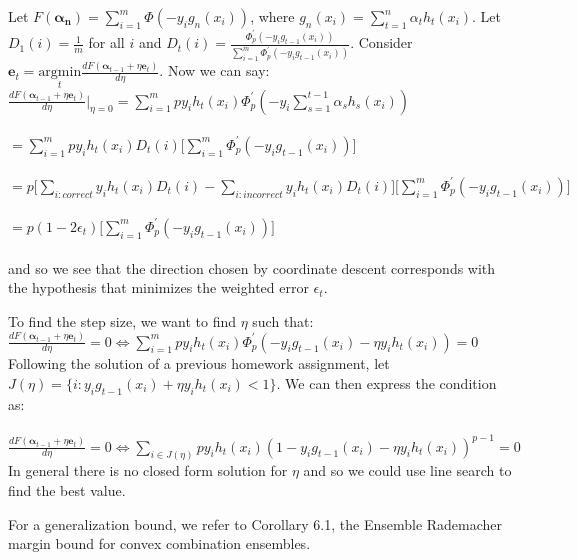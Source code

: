 \documentclass[]{article}
\begin{document}
Let $F(\boldsymbol{\alpha_n}) = \sum_{i=1}^{m} \Phi(-y_i g_n(x_i))$, where $g_n(x_i) = \sum_{t=1}^{n} \alpha_t h_t(x_i)$. Let $D_1(i) = \frac{1}{m}$ for all $i$ and $D_t(i) = \frac{\Phi_p^\prime(-y_i g_{t-1}(x_i))}{\sum_{i=1}^{m}\Phi_p^\prime(-y_i g_{t-1}(x_i))}$. Consider $\boldsymbol{e}_t = \underset{t}{\text{argmin}} \frac{d F(\boldsymbol{\alpha}_{t-1}+\eta \boldsymbol{e}_t)}{d \eta}$. Now we can say:\\

\noindent $\frac{d F(\boldsymbol{\alpha}_{t-1}+\eta \boldsymbol{e}_t)}{d \eta} |_{\eta=0} = \sum_{i=1}^{m} p y_i h_t(x_i)\Phi_p^\prime(-y_i \sum_{s=1}^{t-1}\alpha_s h_s(x_i))$\\\\
$= \sum_{i=1}^{m} p y_i h_t(x_i) D_t(i)\lbrack\sum_{i=1}^{m}\Phi_p^\prime(-y_i g_{t-1}(x_i))\rbrack$\\\\
$= p \lbrack \sum_{i:correct} y_i h_t(x_i) D_t(i) - \sum_{i:incorrect} y_i h_t(x_i) D_t(i) \rbrack \lbrack\sum_{i=1}^{m}\Phi_p^\prime(-y_i g_{t-1}(x_i))\rbrack$\\\\
$= p (1 - 2 \epsilon_t) \lbrack\sum_{i=1}^{m}\Phi_p^\prime(-y_i g_{t-1}(x_i))\rbrack$\\\\
\noindent and so we see that the direction chosen by coordinate descent corresponds with the hypothesis that minimizes the weighted error $\epsilon_t$.

To find the step size, we want to find $\eta$ such that:\\
$\frac{d F(\boldsymbol{\alpha}_{t-1}+\eta \boldsymbol{e}_t)}{d \eta} = 0 \iff \sum_{i=1}^{m} p y_i h_t(x_i)\Phi_p^\prime(-y_i g_{t-1}(x_i) - \eta y_i h_t(x_i)) = 0$\\

Following the solution of a previous homework assignment, let\\ $J(\eta) = \lbrace i: y_i g_{t-1}(x_i) + \eta y_i h_t(x_i) < 1 \rbrace$. We can then express the condition as:\\\\
$\frac{d F(\boldsymbol{\alpha}_{t-1}+\eta \boldsymbol{e}_t)}{d \eta} = 0 \iff \sum_{i \in J(\eta)} p y_i h_t(x_i)(1 - y_i g_{t-1}(x_i) - \eta y_i h_t(x_i))^{p-1} = 0$\\
In general there is no closed form solution for $\eta$ and so we could use line search to find the best value.

For a generalization bound, we refer to Corollary 6.1, the Ensemble Rademacher margin bound for convex combination ensembles.
\end{document}
